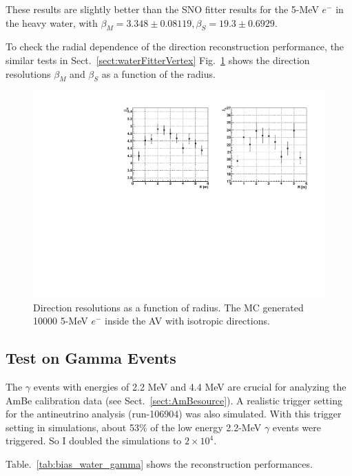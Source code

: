 These results are slightly better than the SNO fitter results for the 5-MeV $e^-$ in the heavy water, with $\beta_M=3.348\pm 0.08119, \beta_S=19.3\pm 0.6929$\cite{boulay2004direct}.

To check the radial dependence of the direction reconstruction performance, the similar tests in Sect.~\ref{sect:waterFitterVertex}
Fig.~\ref{fig:diResolVsShell_5MeV} shows the direction resolutions $\beta_M$ and $\beta_S$ as a function of the radius.
\begin{figure}[htbp]
	\centering
	\includegraphics[width=14cm]{DirResolVsShell.pdf}
	\caption[Direction resolutions as a function of radius.]{Direction resolutions as a function of radius. The MC generated 10000 5-MeV $e^-$ inside the AV with isotropic directions.\label{fig:diResolVsShell_5MeV}}
\end{figure}

\subsection{Test on Gamma Events}

The $\gamma$ events with energies of 2.2 MeV and 4.4 MeV are crucial for analyzing the AmBe calibration data (see Sect.~\ref{sect:AmBesource}). 
A realistic trigger setting for the antineutrino analysis (run-106904) was also simulated. 
With this trigger setting in simulations, about 53\% of the low energy 2.2-MeV $\gamma$ events were triggered. So I doubled the simulations to $2\times10^4$.

Table.~\ref{tab:bias_water_gamma} shows the reconstruction performances.

